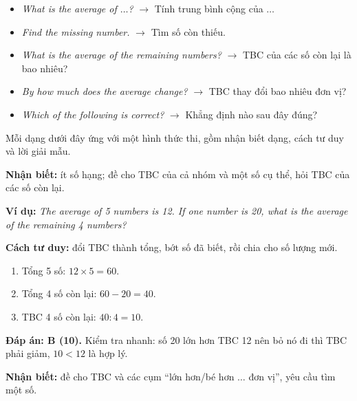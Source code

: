 \documentclass[../main.tex]{subfiles}
\begin{document}
\begin{itemize}
  \item \textit{What is the average of $\dots$?} $\to$ Tính trung bình cộng của $\dots$
  \item \textit{Find the missing number.} $\to$ Tìm số còn thiếu.
  \item \textit{What is the average of the remaining numbers?} $\to$ TBC của các số còn lại là bao nhiêu?
  \item \textit{By how much does the average change?} $\to$ TBC thay đổi bao nhiêu đơn vị?
  \item \textit{Which of the following is correct?} $\to$ Khẳng định nào sau đây đúng?
\end{itemize}

Mỗi dạng dưới đây ứng với một hình thức thi, gồm nhận biết dạng, cách tư duy và lời giải mẫu.

\textbf{Nhận biết:} ít số hạng; đề cho TBC của cả nhóm và một số cụ thể, hỏi TBC của các số còn lại.

\smallskip\noindent\textbf{Ví dụ:} \textit{The average of 5 numbers is 12. If one number is 20, what is the average of the remaining 4 numbers?}

\noindent\hspace*{0.5cm}%

\smallskip\noindent\textbf{Cách tư duy:} đổi TBC thành tổng, bớt số đã biết, rồi chia cho số lượng mới.
\begin{STloigiai}
\begin{enumerate}
  \item Tổng 5 số: $12\times 5=60$.
  \item Tổng 4 số còn lại: $60-20=40$.
  \item TBC 4 số còn lại: $40:4=10$.
\end{enumerate}
\textbf{Đáp án: B (10).} Kiểm tra nhanh: số 20 lớn hơn TBC 12 nên bỏ nó đi thì TBC phải giảm, $10<12$ là hợp lý.
\end{STloigiai}

\textbf{Nhận biết:} đề cho TBC và các cụm ``lớn hơn/bé hơn $\dots$ đơn vị'', yêu cầu tìm một số.
\end{document}
